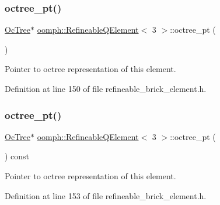\subsubsection{\texorpdfstring{octree\+\_\+pt()}{octree\_pt()}\hspace{0.1cm}{\footnotesize\ttfamily [1/2]}}
{\footnotesize\ttfamily \hyperlink{classoomph_1_1OcTree}{Oc\+Tree}$\ast$ \hyperlink{classoomph_1_1RefineableQElement}{oomph\+::\+Refineable\+Q\+Element}$<$ 3 $>$\+::octree\+\_\+pt (\begin{DoxyParamCaption}{ }\end{DoxyParamCaption})\hspace{0.3cm}{\ttfamily [inline]}}



Pointer to octree representation of this element. 



Definition at line 150 of file refineable\+\_\+brick\+\_\+element.\+h.

\mbox{\label{classoomph_1_1RefineableQElement_3_013_01_4_a58e295694d08140d1060f79005129fb9}} 
\subsubsection{\texorpdfstring{octree\+\_\+pt()}{octree\_pt()}\hspace{0.1cm}{\footnotesize\ttfamily [2/2]}}
{\footnotesize\ttfamily \hyperlink{classoomph_1_1OcTree}{Oc\+Tree}$\ast$ \hyperlink{classoomph_1_1RefineableQElement}{oomph\+::\+Refineable\+Q\+Element}$<$ 3 $>$\+::octree\+\_\+pt (\begin{DoxyParamCaption}{ }\end{DoxyParamCaption}) const\hspace{0.3cm}{\ttfamily [inline]}}



Pointer to octree representation of this element. 



Definition at line 153 of file refineable\+\_\+brick\+\_\+element.\+h.

\mbox{\label{classoomph_1_1RefineableQElement_3_013_01_4_aa8ea5cf2c9fee8ff9a1c52505e736bbb}} 

